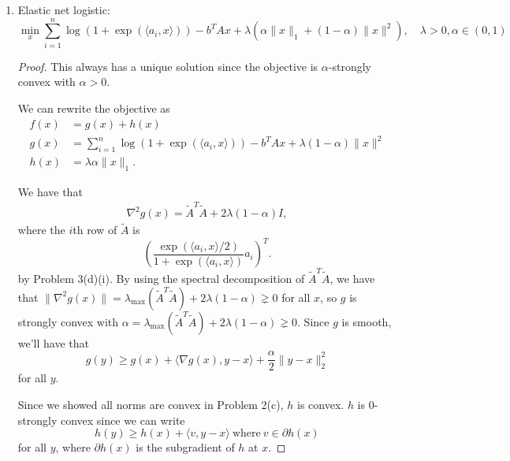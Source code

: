 \documentclass[11pt]{amsart}
\begin{document}
\begin{enumerate}
\begin{enumerate}
\begin{enumerate}
\begin{proof}
    For $x$ to be a unique minimizer, $A^TAx = A^Tb$ must have a unique
    solution. This will occur if and only if the null space of $A^TA$ is the
    empty set, that is, $A^TA$ is positive definite.
  \end{proof}
\item Elastic net logistic: 
\[
\min_x \sum_{i=1}^n \log(1 + \exp(\langle a_i, x\rangle)) - b^TAx + \lambda(\alpha \|x\|_1 + (1-\alpha)\|x\|^2), \quad \lambda>0, \alpha \in (0,1)
\]

\begin{proof}
  This always has a unique solution since the objective is $\alpha$-strongly
  convex with $\alpha > 0$.
  
  We can rewrite the objective as
  \begin{align*}
    f(x) &= g(x) + h(x)\\
    g(x) &= \sum_{i=1}^n \log(1 + \exp(\langle a_i, x\rangle)) - b^TAx + \lambda(1-\alpha)\|x\|^2 \\
    h(x) &= \lambda\alpha \|x\|_1.
  \end{align*}  

  We have that
  \begin{align*}
    \nabla^2 g(x) = \tilde{A}^T\tilde{A} + 2\lambda(1 - \alpha)I,
  \end{align*}
  where the $i$th row of $\tilde{A}$ is
  $$
  \left(\frac{\exp(\langle a_i , x \rangle / 2)}{1 + \exp(\langle a_i , x \rangle)}a_i\right)^T.
  $$
  by Problem 3(d)(i). By using the spectral decomposition of
  $\tilde{A}^T\tilde{A}$, we have that
  $\lVert \nabla^2 g(x) \rVert =
  \lambda_{\operatorname{max}}\left(\tilde{A}^T\tilde{A}\right) + 2\lambda(1 -
  \alpha) \gneq 0$ for all $x$, so $g$ is strongly convex with
  $\alpha = \lambda_{\operatorname{max}}\left(\tilde{A}^T\tilde{A}\right) +
  2\lambda(1 - \alpha) \gneq 0$. Since $g$ is smooth, we'll have that
  $$
  g(y) \geq g(x) + \langle \nabla g(x), y - x \rangle + \frac{\alpha}{2}\lVert y - x\rVert_2^2
  $$
  for all $y$.

  Since we showed all norms are convex in Problem 2(c), $h$ is convex. $h$ is
  $0$-strongly convex since we can write
  $$
  h(y) \geq h(x) + \langle v, y - x \rangle~\text{where}~v \in \partial h(x)
  $$
  for all $y$, where $\partial h(x)$ is the subgradient of $h$ at $x$.


\end{proof}
\end{enumerate}
\end{enumerate}
\end{enumerate}
\end{document}
